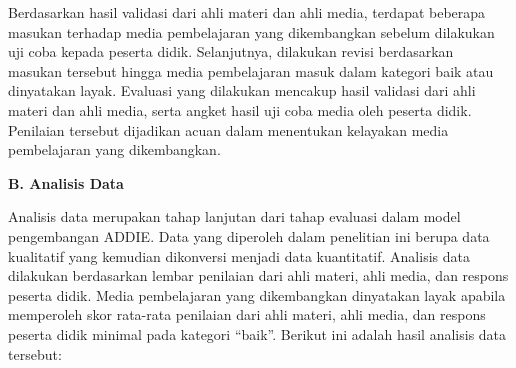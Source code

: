 \documentclass[12pt]{article}
\begin{document}
\begin{enumerate}[leftmargin=1cm, label=\arabic*.]
    \hspace{1cm}Berdasarkan hasil validasi dari ahli materi dan ahli media, terdapat beberapa masukan terhadap media pembelajaran yang dikembangkan sebelum dilakukan uji coba kepada peserta didik. Selanjutnya, dilakukan revisi berdasarkan masukan tersebut hingga media pembelajaran masuk dalam kategori baik atau dinyatakan layak. Evaluasi yang dilakukan mencakup hasil validasi dari ahli materi dan ahli media, serta angket hasil uji coba media oleh peserta didik. Penilaian tersebut dijadikan acuan dalam menentukan kelayakan media pembelajaran yang dikembangkan.

\end{enumerate}

\textbf{B. Analisis Data}

\hspace{1cm}Analisis data merupakan tahap lanjutan dari tahap evaluasi dalam model pengembangan ADDIE. Data yang diperoleh dalam penelitian ini berupa data kualitatif yang kemudian dikonversi menjadi data kuantitatif. Analisis data dilakukan berdasarkan lembar penilaian dari ahli materi, ahli media, dan respons peserta didik. Media pembelajaran yang dikembangkan dinyatakan layak apabila memperoleh skor rata-rata penilaian dari ahli materi, ahli media, dan respons peserta didik minimal pada kategori “baik”. Berikut ini adalah hasil analisis data tersebut:
\end{document}
